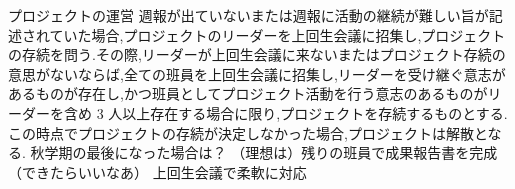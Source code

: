 プロジェクトの運営
    週報が出ていないまたは週報に活動の継続が難しい旨が記述されていた場合,プロジェクトのリーダーを上回生会議に招集し,プロジェクトの存続を問う.その際,リーダーが上回生会議に来ないまたはプロジェクト存続の意思がないならば,全ての班員を上回生会議に招集し,リーダーを受け継ぐ意志があるものが存在し,かつ班員としてプロジェクト活動を行う意志のあるものがリーダーを含め 3 人以上存在する場合に限り,プロジェクトを存続するものとする.この時点でプロジェクトの存続が決定しなかった場合,プロジェクトは解散となる.
    秋学期の最後になった場合は？
    （理想は）残りの班員で成果報告書を完成（できたらいいなあ）
    上回生会議で柔軟に対応
        
    
